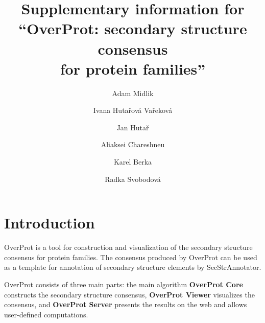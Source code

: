 \documentclass{article}
\begin{document}
\title{Supplementary information for \\ ``OverProt: secondary structure consensus \\for protein families''}

\author[1,2]{Adam Midlik}
\author[1,2,3]{Ivana Hutařová Vařeková}
\author[1,2]{Jan Hutař}
\author[1,2]{Aliaksei Chareshneu}
\author[4,*]{Karel Berka}
\author[1,2,*]{Radka Svobodová}

\date{}  %

\maketitle

\renewcommand{\contentsname}{Table of contents}
\tableofcontents
\clearpage


\section{Introduction}

OverProt is a tool for construction and visualization of the secondary
structure consensus for protein families. The consensus produced by
OverProt can be used as a template for annotation of secondary structure
elements by SecStrAnnotator.

OverProt consists of three main parts: the main algorithm
\textbf{OverProt Core} constructs the secondary structure consensus,
\textbf{OverProt Viewer} visualizes the consensus, and \textbf{OverProt
Server} presents the results on the web and allows user-defined
computations.




\end{document}
